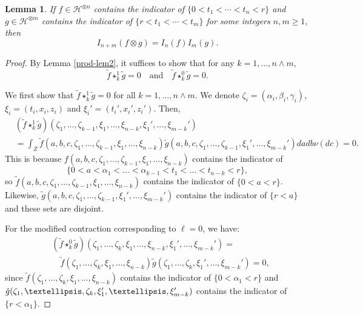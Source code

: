 \documentclass[10pt,a4paper]{amsart}
\newtheorem{lemma}{Lemma}
\def\cH{\mathcal{H}}
\begin{document}
\begin{lemma}
\label{prod-lem} 
 If $f \in \cH^{\otimes n}$ contains the indicator of $\{0 < t_1 < \cdots < t_n < r \}$ and $g \in \cH^{\otimes m}$ contains the indicator of $\{r < t_1 < \cdots < t_m \}$ for some integers $n,m \geq 1$, then
\[
I_{n+m}(f\otimes g)=I_{n}(f) I_{m}(g).
\]
\end{lemma}

\begin{proof} By Lemma \ref{prod-lem2}, it suffices to show that for any $k=1,\ldots,n\wedge m$,
\[
\tilde{f} \star_k^1 \tilde{g}=0 \quad \mbox{and} \quad \tilde{f} \star_k^0 \tilde{g}=0.
\]


We first show that $\tilde{f} \star_k^1 \tilde{g}=0$ for all $k=1,\ldots,n\wedge m$. We denote $\zeta_i=(\alpha_i,\beta_i,\gamma_i)$, $\xi_i=(t_i,x_i,z_i)$ and  $\xi_i'=(t_i',x_i',z_i')$. Then,
\begin{align*}
& (\tilde{f} \star_k^1 \tilde{g})(\zeta_1,\ldots,\zeta_{k-1},\xi_1,\ldots,\xi_{n-k},\xi_1',\ldots,\xi_{m-k}')\\
& = \int_{Z} \tilde{f}(a,b,c,\zeta_1,\ldots,\zeta_{k-1},\xi_1,\ldots,\xi_{n-k})
\tilde{g}(a,b,c,\zeta_1,\ldots,\zeta_{k-1},\xi_1',\ldots,\xi_{m-k}')da db \nu(dc)=0.
\end{align*}
This is because $f(a,b,c,\zeta_1,\ldots,\zeta_{k-1},\xi_1,\ldots,\xi_{n-k})$ contains the indicator of
\[
\{0<a<\alpha_1<\ldots< \alpha_{k-1}<t_1<\ldots<t_{n-k}<r\},
\]
so $\tilde{f}(a,b,c,\zeta_1,\ldots,\zeta_{k-1},\xi_1,\ldots,\xi_{n-k})$ contains the indicator of $\{0 < a < r\}$. Likewise, $\tilde{g}(a,b,c,\zeta_1,\ldots,\zeta_{k-1},\xi_1',\ldots,\xi_{m-k}')$ contains the indicator of $\{r<a\}$ and these sets are disjoint.

For the modified contraction corresponding to $\ell=0$, we have:
\begin{align*}
& (\tilde{f} \star_k^0 \tilde{g})(\zeta_1,\ldots,\zeta_{k},\xi_1,\ldots,\xi_{n-k},\xi_1',\ldots,\xi_{m-k}')=\\
& \quad  \tilde{f}(\zeta_1,\ldots,\zeta_{k},\xi_1,\ldots,\xi_{n-k})
\tilde{g}(\zeta_1,\ldots,\zeta_{k},\xi_1',\ldots,\xi_{m-k}')=0,
\end{align*}
since $\tilde{f}(\zeta_1,\ldots,\zeta_{k},\xi_1,\ldots,\xi_{n-k})$ contains the indicator of
$\{0<\alpha_1<r\}$ and $\tilde{g}(\zeta_1,\ldots,\zeta_{k},\linebreak \xi_1',\ldots,\xi_{m-k}')$ contains the indicator of $\{r<\alpha_1\}$.
\end{proof}
\end{document}
